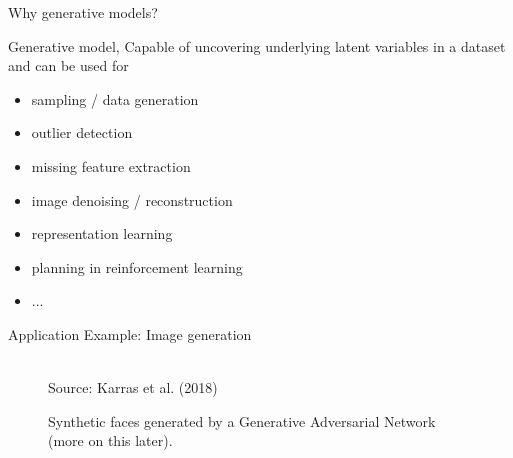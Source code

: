 \begin{frame}{Why generative models?}
    
    Generative model, Capable of uncovering underlying latent variables in a dataset and
    can be used for
    
    \begin{itemize}
    \item sampling / data generation
    \item outlier detection
    \item missing feature extraction
    \item image denoising / reconstruction
    \item representation learning
    \item planning in reinforcement learning
    \item ...
    \end{itemize}
    
\end{frame}


\begin{frame} {Application Example: Image generation}
    
        \vspace{8mm}
    \begin{figure}
    \centering
    \tiny{\\Source: Karras et al. (2018)}
    \caption{Synthetic faces generated by a Generative Adversarial Network (more on this later).}
    \end{figure}

\end{frame}

